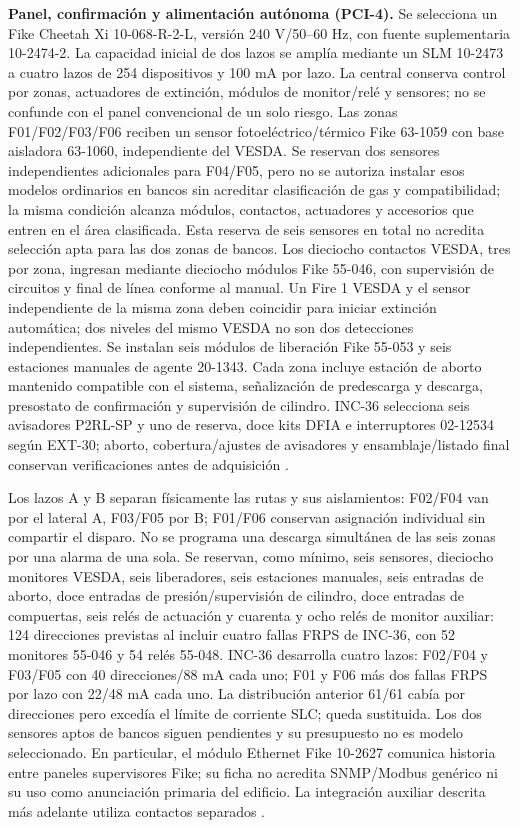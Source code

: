 \textbf{Panel, confirmación y alimentación autónoma (PCI-4).}\label{sec:sd4-pci4}
Se selecciona un Fike Cheetah Xi 10-068-R-2-L, versión 240 V/50--60 Hz, con fuente suplementaria 10-2474-2. La capacidad inicial de dos lazos se amplía mediante un SLM 10-2473 a cuatro lazos de 254 dispositivos y 100 mA por lazo. La central conserva control por zonas, actuadores de extinción, módulos de monitor/relé y sensores; no se confunde con el panel convencional de un solo riesgo. Las zonas F01/F02/F03/F06 reciben un sensor fotoeléctrico/térmico Fike 63-1059 con base aisladora 63-1060, independiente del VESDA. Se reservan dos sensores independientes adicionales para F04/F05, pero no se autoriza instalar esos modelos ordinarios en bancos sin acreditar clasificación de gas y compatibilidad; la misma condición alcanza módulos, contactos, actuadores y accesorios que entren en el área clasificada. Esta reserva de seis sensores en total no acredita selección apta para las dos zonas de bancos. Los dieciocho contactos VESDA, tres por zona, ingresan mediante dieciocho módulos Fike 55-046, con supervisión de circuitos y final de línea conforme al manual. Un Fire 1 VESDA y el sensor independiente de la misma zona deben coincidir para iniciar extinción automática; dos niveles del mismo VESDA no son dos detecciones independientes. Se instalan seis módulos de liberación Fike 55-053 y seis estaciones manuales de agente 20-1343. Cada zona incluye estación de aborto mantenido compatible con el sistema, señalización de predescarga y descarga, presostato de confirmación y supervisión de cilindro. INC-36 selecciona seis avisadores P2RL-SP y uno de reserva, doce kits DFIA e interruptores 02-12534 según EXT-30; aborto, cobertura/ajustes de avisadores y ensamblaje/listado final conservan verificaciones antes de adquisición \parencite[pp.~1--6]{l18-cheetah}.

Los lazos A y B separan físicamente las rutas y sus aislamientos: F02/F04 van por el lateral A, F03/F05 por B; F01/F06 conservan asignación individual sin compartir el disparo. No se programa una descarga simultánea de las seis zonas por una alarma de una sola. Se reservan, como mínimo, seis sensores, dieciocho monitores VESDA, seis liberadores, seis estaciones manuales, seis entradas de aborto, doce entradas de presión/supervisión de cilindro, doce entradas de compuertas, seis relés de actuación y cuarenta y ocho relés de monitor auxiliar: 124 direcciones previstas al incluir cuatro fallas FRPS de INC-36, con 52 monitores 55-046 y 54 relés 55-048. INC-36 desarrolla cuatro lazos: F02/F04 y F03/F05 con 40 direcciones/88 mA cada uno; F01 y F06 más dos fallas FRPS por lazo con 22/48 mA cada uno. La distribución anterior 61/61 cabía por direcciones pero excedía el límite de corriente SLC; queda sustituida. Los dos sensores aptos de bancos siguen pendientes y su presupuesto no es modelo seleccionado. En particular, el módulo Ethernet Fike 10-2627 comunica historia entre paneles supervisores Fike; su ficha no acredita SNMP/Modbus genérico ni su uso como anunciación primaria del edificio. La integración auxiliar descrita más adelante utiliza contactos separados \parencites[pp.~3--6]{l18-cheetah}[pp.~1--3]{l18-fike-ethernet}.

